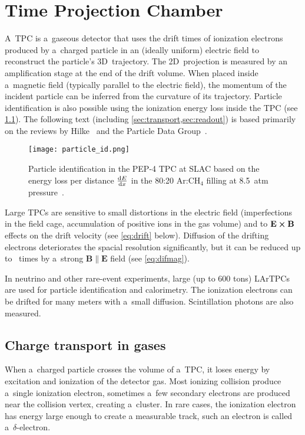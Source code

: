 \chapter{Time Projection Chamber}
\label{sec:tpc}
	A~\acf{TPC} is a~gaseous detector that uses the drift times of ionization electrons produced by a~charged particle in an (ideally uniform) electric field to reconstruct the particle's 3D~trajectory. The 2D~projection is measured by an amplification stage at the end of the drift volume. When placed inside a~magnetic field (typically parallel to the electric field), the momentum of the incident particle can be inferred from the curvature of its trajectory. Particle identification is also possible using the ionization energy loss inside the \ac{TPC} (see \cref{fig:particleid}). The following text (including \cref{sec:transport,sec:readout}) is based primarily on the reviews by Hilke~\cite{TPCs} and the Particle Data Group~\cite{pdg2024}.
	
	\begin{figure}[H]
		\centering
		\texttt{[image: particle\_id.png]}
		\caption{Particle identification in the PEP-4 \ac{TPC} at SLAC based on the energy loss per distance $\dv{E}{x}$ in the 80:20 Ar:CH$_4$ filling at \qty{8.5}{atm} pressure~\cite{particleid}.}
		\label{fig:particleid}
	\end{figure}
	
	Large \acp{TPC} are sensitive to small distortions in the electric field (imperfections in the field cage, accumulation of positive ions in the gas volume) and to $\mathbf{E}\cross\mathbf{B}$ effects on the drift velocity (see \cref{eq:drift} below). Diffusion of the drifting electrons deteriorates the spacial resolution significantly, but it can be reduced up to ~times by a~strong $\mathbf{B}\parallel\mathbf{E}$ field (see \cref{eq:difmag}).
	
	In neutrino and other rare-event experiments, large (up to 600 tons) \acp{LArTPC} are used for particle identification and calorimetry. The ionization electrons can be drifted for many meters with a~small diffusion. Scintillation photons are also measured.
	
	\section{Charge transport in gases}
	\label{sec:transport}
		When a~charged particle crosses the volume of a~\ac{TPC}, it loses energy by excitation and ionization of the detector gas. Most ionizing collision produce a~single ionization electron, sometimes a~few secondary electrons are produced near the collision vertex, creating a~cluster. In rare cases, the ionization electron has energy large enough to create a measurable track, such an electron is called a~$\delta$\nobreakdash-electron.
		
